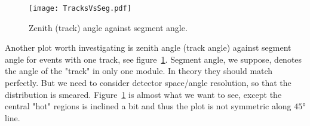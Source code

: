 \begin{figure}[H]
	\centering
	\texttt{[image: TracksVsSeg.pdf]}
	\caption{Zenith (track) angle against segment angle.}%
	\label{fig:TracksVsSeg}
\end{figure}
Another plot worth investigating is zenith angle (track angle) against segment angle for events with one track, see figure~\ref{fig:TracksVsSeg}. Segment angle, we suppose, denotes the angle of the "track" in only one module. In theory they should match perfectly. But we need to consider detector space/angle resolution, so that the distribution is smeared. Figure~\ref{fig:TracksVsSeg} is almost what we want to see, except the central "hot" regions is inclined a bit and thus the plot is not symmetric along $\ang{45}$ line.

